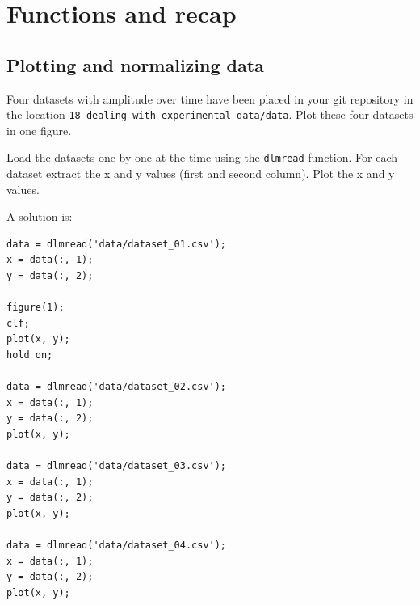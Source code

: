 \section{Functions and recap}

\subsection{Plotting and normalizing data}

\begin{ex} \label{exComparingRawDataSets}%
Four datasets with amplitude over time have been 
placed in your git repository in the location
\verb!18_dealing_with_experimental_data/data!.
Plot these four datasets in one figure.
\begin{hint}
Load the datasets one by one at the time using the \verb!dlmread! function.
For each dataset extract the x and y values (first and second column).
Plot the x and y values.
\end{hint}
\begin{sol}
A solution is:
\begin{lstlisting}
data = dlmread('data/dataset_01.csv');
x = data(:, 1);
y = data(:, 2);

figure(1);
clf;
plot(x, y);
hold on;

data = dlmread('data/dataset_02.csv');
x = data(:, 1);
y = data(:, 2);
plot(x, y);

data = dlmread('data/dataset_03.csv');
x = data(:, 1);
y = data(:, 2);
plot(x, y);

data = dlmread('data/dataset_04.csv');
x = data(:, 1);
y = data(:, 2);
plot(x, y);
\end{lstlisting}
\end{sol}
\end{ex}



